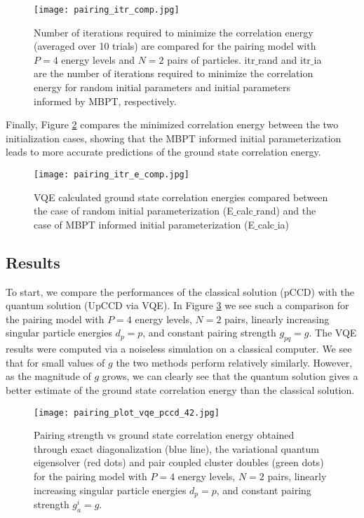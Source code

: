 \documentclass[10pt]{article}
\begin{document}
\begin{figure}[H]
    \centering
    \texttt{[image: pairing\_itr\_comp.jpg]}
    \caption{Number of iterations required to minimize the correlation energy (averaged over 10 trials) are compared for the pairing model with $P=4$ energy levels and $N=2$ pairs of particles. itr$\_$rand and itr$\_$ia are the number of iterations required to minimize the correlation energy for random initial parameters and initial parameters informed by MBPT, respectively.}
    \label{fig:pairing_itr_comp}
\end{figure}

Finally, Figure \ref{fig:pairing_itr_e_comp} compares the minimized correlation energy between the two initialization cases, showing that the MBPT informed initial parameterization leads to more accurate predictions of the ground state correlation energy.

\begin{figure}[H]
    \centering
    \texttt{[image: pairing\_itr\_e\_comp.jpg]}
    \caption{VQE calculated ground state correlation energies compared between the case of random initial parameterization (E$\_$calc$\_$rand) and the case of MBPT informed initial parameterization (E$\_$calc$\_$ia)}
    \label{fig:pairing_itr_e_comp}
\end{figure}


\subsection{Results}

To start, we compare the performances of the classical solution (pCCD) with the quantum solution (UpCCD via VQE). In Figure \ref{fig:pairing_plot_vqe_pccd_42} we see such a comparison for the pairing model with $P=4$ energy levels, $N=2$ pairs, linearly increasing singular particle energies $d_p=p$, and constant pairing strength $g_{pq}=g$. The VQE results were computed via a noiseless simulation on a classical computer. We see that for small values of $g$ the two methods perform relatively similarly. However, as the magnitude of $g$ grows, we can clearly see that the quantum solution gives a better estimate of the ground state correlation energy than the classical solution.

\begin{figure}[t]
    \centering
    \texttt{[image: pairing\_plot\_vqe\_pccd\_42.jpg]}
    \caption
    {Pairing strength vs ground state correlation energy obtained through exact diagonalization (blue line), the variational quantum eigensolver (red dots) and pair coupled cluster doubles (green dots) for the pairing model with $P=4$ energy levels, $N=2$ pairs, linearly increasing singular particle energies $d_p=p$, and constant pairing strength $g^i_a=g$.}
    \label{fig:pairing_plot_vqe_pccd_42}
\end{figure}
\end{document}

